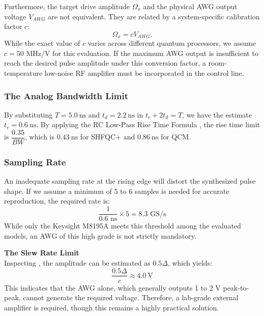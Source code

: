 Furthermore, the target drive amplitude $\Omega_{x}$ and the physical AWG output voltage $V_{AWG}$ are not equivalent.
They are related by a system-specific calibration factor $c$:
$$\Omega_{x} = c V_{AWG}.$$
While the exact value of $c$ varies across different quantum processors, we assume $c = 50$ MHz/V for this
evaluation.
If the maximum AWG output is insufficient to reach the desired pulse amplitude under this conversion factor,
a room-temperature low-noise RF amplifier must be incorporated in the control line.

\subsubsection*{The Analog Bandwidth Limit}
By substituting $T=5.0~\text{ns}$ and $t_d=2.2~\text{ns}$ in $t_r+2t_d = T$, we have the estimate $t_r=0.6~\text{ns}$.
By applying the RC Low-Pass Rise Time Formula \cite{horowitz2015art}, the rise time limit is $\dfrac{0.35}{BW}$,
which is $0.43~\text{ns}$ for SHFQC+ and $0.86~\text{ns}$ for QCM.

\subsubsection*{Sampling Rate}
An inadequate sampling rate at the rising edge will distort the synthesized pulse shape. If we assume a minimum of 5 to
6 samples is needed for accurate reproduction, the required rate is:
$$ \frac{1}{0.6 \text{ ns}} \times 5 = 8.3 \text{ GS/s} $$
While only the Keysight M8195A meets this threshold among the evaluated models, an AWG of this high grade is not strictly mandatory.

\noindent\textbf{The Slew Rate Limit}\\
Inspecting , the amplitude can be estimated as $0.5\Delta$, which yields:
$$ \frac{0.5\Delta}{c} \approx 4.0~\text{V} $$
This indicates that the AWG alone, which generally outputs 1 to 2 V peak-to-peak, cannot generate the required voltage.
Therefore, a lab-grade external amplifier is required, though this remains a highly practical solution.


